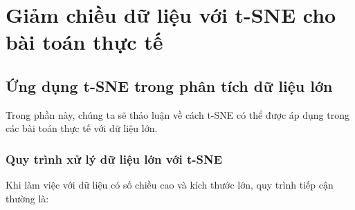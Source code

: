 \documentclass[
]{article}
\begin{document}
\section{Giảm chiều dữ liệu với t-SNE cho bài toán thực
tế}\label{giux1ea3m-chiux1ec1u-dux1eef-liux1ec7u-vux1edbi-t-sne-cho-buxe0i-touxe1n-thux1ef1c-tux1ebf}

\subsection{Ứng dụng t-SNE trong phân tích dữ liệu
lớn}\label{ux1ee9ng-dux1ee5ng-t-sne-trong-phuxe2n-tuxedch-dux1eef-liux1ec7u-lux1edbn}

Trong phần này, chúng ta sẽ thảo luận về cách t-SNE có thể được áp dụng
trong các bài toán thực tế với dữ liệu lớn.

\subsubsection{Quy trình xử lý dữ liệu lớn với
t-SNE}\label{quy-truxecnh-xux1eed-luxfd-dux1eef-liux1ec7u-lux1edbn-vux1edbi-t-sne}

Khi làm việc với dữ liệu có số chiều cao và kích thước lớn, quy trình
tiếp cận thường là:
\end{document}
